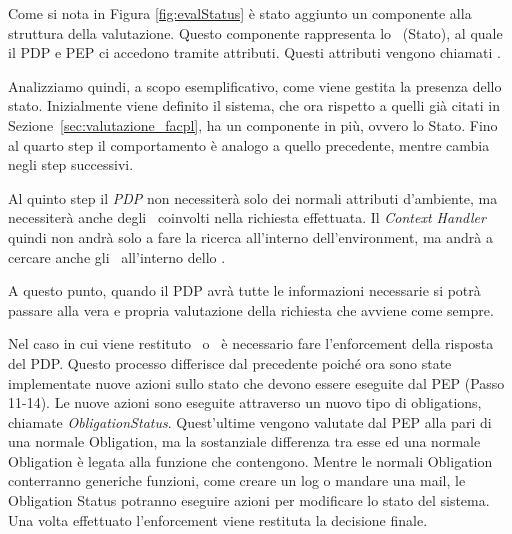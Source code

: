 Come si nota in Figura \ref{fig:evalStatus} è stato aggiunto un componente alla struttura della valutazione.
Questo componente rappresenta lo \status \ (Stato), al quale il \ac{PDP} e \ac{PEP} ci accedono tramite attributi.
Questi attributi vengono chiamati \statusattribute. \par
Analizziamo quindi, a scopo esemplificativo, come viene gestita la presenza dello stato. Inizialmente viene definito il sistema, che ora rispetto a quelli già citati in Sezione~\ref{sec:valutazione_facpl}, ha un componente in più, ovvero lo Stato.
Fino al quarto step il comportamento è analogo a quello precedente, mentre cambia negli step successivi. \par
Al quinto step il \textit{PDP} non necessiterà solo dei normali attributi d'ambiente, ma necessiterà anche degli \statusattribute \ coinvolti nella richiesta effettuata. Il \textit{Context Handler} quindi non andrà solo a fare la ricerca all'interno dell'environment, ma andrà a cercare anche gli \statusattribute \ all'interno dello \status. \par
A questo punto, quando il \ac{PDP} avrà tutte le informazioni necessarie si potrà passare alla vera e propria valutazione della richiesta che avviene come sempre. \par
Nel caso in cui viene restituto \permit \ o \deny \ è necessario fare l'enforcement della risposta del \ac{PDP}. Questo processo differisce dal precedente poiché ora sono state implementate nuove azioni sullo stato che devono essere eseguite dal \ac{PEP} (Passo 11-14). Le nuove azioni sono eseguite attraverso un nuovo tipo di obligations, chiamate \textit{ObligationStatus}. 
Quest'ultime vengono valutate dal \ac{PEP} alla pari di una normale Obligation, ma la sostanziale differenza tra esse ed una normale Obligation è legata alla funzione che contengono. Mentre le normali Obligation conterranno generiche funzioni, come creare un log o mandare una mail, le Obligation Status potranno eseguire azioni per modificare lo stato del sistema.
Una volta effettuato l'enforcement viene restituta la decisione finale.




